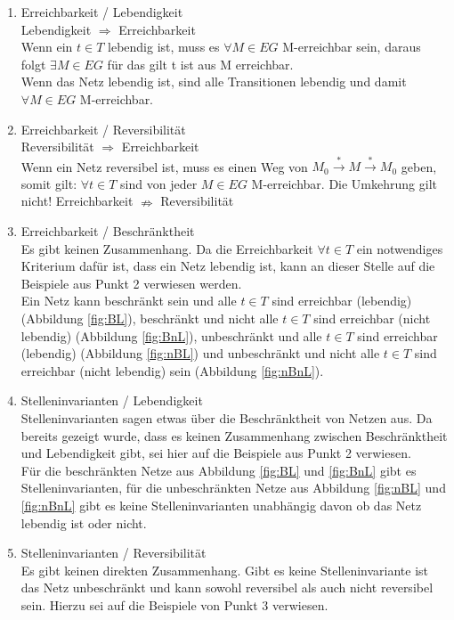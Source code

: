 \documentclass[10pt]{scrartcl}
\begin{document}
\begin{enumerate}
\item{Erreichbarkeit / Lebendigkeit}\\
Lebendigkeit $\Rightarrow$ Erreichbarkeit\\
Wenn ein $t \in T$ lebendig ist, muss es $\forall M \in EG$ M-erreichbar sein, daraus folgt $\exists M \in EG$ für das gilt t ist aus M erreichbar.\\
Wenn das Netz lebendig ist, sind alle Transitionen lebendig und damit $\forall M \in EG$ M-erreichbar.

\item{Erreichbarkeit / Reversibilität}\\
Reversibilität $\Rightarrow$ Erreichbarkeit\\
Wenn ein Netz reversibel ist, muss es einen Weg von $M_{0} \overset{*}{\rightarrow} M \overset{*}{\rightarrow} M_{0}$ geben, somit gilt: $\forall t \in T$ sind von jeder $M \in EG$ M-erreichbar.
Die Umkehrung gilt nicht! Erreichbarkeit $\nRightarrow$ Reversibilität

\item{Erreichbarkeit / Beschränktheit}\\\label{erreichbarkeit_beschraenktheit}
Es gibt keinen Zusammenhang. Da die Erreichbarkeit $\forall t \in T$ ein notwendiges Kriterium dafür ist, dass ein Netz lebendig ist, kann an dieser Stelle auf die Beispiele aus Punkt 2 verwiesen werden.\\
Ein Netz kann beschränkt sein und alle $t \in T$ sind erreichbar (lebendig) (Abbildung \ref{fig:BL}), beschränkt und nicht alle $t \in T$ sind erreichbar (nicht lebendig) (Abbildung \ref{fig:BnL}), unbeschränkt und alle $t \in T$ sind erreichbar (lebendig) (Abbildung \ref{fig:nBL}) und unbeschränkt und nicht alle $t \in T$ sind erreichbar (nicht lebendig) sein (Abbildung \ref{fig:nBnL}).

\item{Stelleninvarianten / Lebendigkeit}\\
Stelleninvarianten sagen etwas über die Beschränktheit von Netzen aus. Da bereits gezeigt wurde, dass es keinen Zusammenhang zwischen Beschränktheit und Lebendigkeit gibt, sei hier auf die Beispiele aus Punkt 2 verwiesen.\\
Für die beschränkten Netze aus Abbildung \ref{fig:BL} und \ref{fig:BnL} gibt es Stelleninvarianten, für die unbeschränkten Netze aus Abbildung \ref{fig:nBL} und \ref{fig:nBnL} gibt es keine Stelleninvarianten unabhängig davon ob das Netz lebendig ist oder nicht.

\item{Stelleninvarianten / Reversibilität}\\
Es gibt keinen direkten Zusammenhang. Gibt es keine Stelleninvariante ist das Netz unbeschränkt und kann sowohl reversibel als auch nicht reversibel sein. Hierzu sei auf die Beispiele von Punkt 3 verwiesen.


\end{enumerate}
\end{document}

